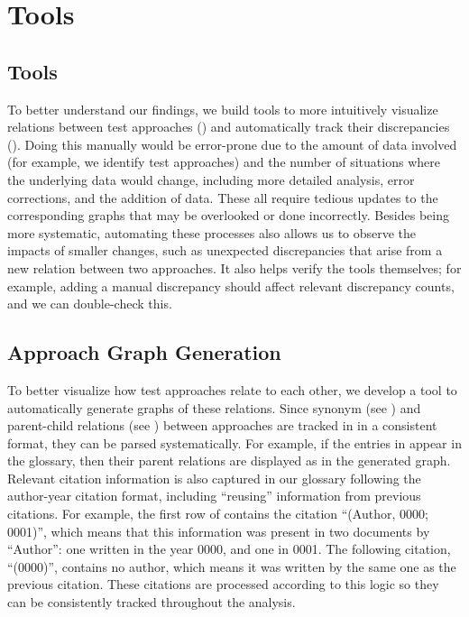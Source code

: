 \ifnotpaper
    \section{Tools}
\else
    \subsection{Tools}
\fi
\label{tools}

\ifnotpaper
    To better understand our findings, we build tools to more intuitively
    visualize relations between test approaches () and
    automatically track their discrepancies (). Doing
    this manually would be error-prone due to the amount of data involved (for
    example, we identify \approachCount{} test approaches) and the number of
    situations where the underlying data would change, including more detailed
    analysis, error corrections, and the addition of data. These all require
    tedious updates to the corresponding graphs that may be overlooked or done
    incorrectly. Besides being more systematic, automating these processes also
    allows us to observe the impacts of smaller changes, such as unexpected
    discrepancies that arise from a new relation between two approaches. It
    also helps verify the tools themselves; for example, adding a manual
    discrepancy should affect relevant discrepancy counts, and we can
    double-check this.

    \subsection{Approach Graph Generation}
    \label{graph-gen}
\fi

To better visualize how test approaches relate to each other, we
develop a tool to automatically generate graphs of these relations.
\ifnotpaper Since synonym (see ) and parent-child relations
    (see ) between approaches are tracked in
     in a consistent format, they can be parsed
    systematically. For example, if the entries in 
    appear in the glossary, then their parent relations are displayed as
     in the generated graph. Relevant citation
    information is also captured in our glossary following the author-year
    citation format, including ``reusing'' information from previous
    citations. For example, the first row of 
    contains the citation ``(Author, 0000; 0001)'', which means that this
    information was present in two documents by ``Author'': one written in
    the year 0000, and one in 0001. The following citation, ``(0000)'',
    contains no author, which means it was written by the same one as the
    previous citation. These citations are processed according to this
    logic  so they can be
    consistently tracked throughout the analysis.

